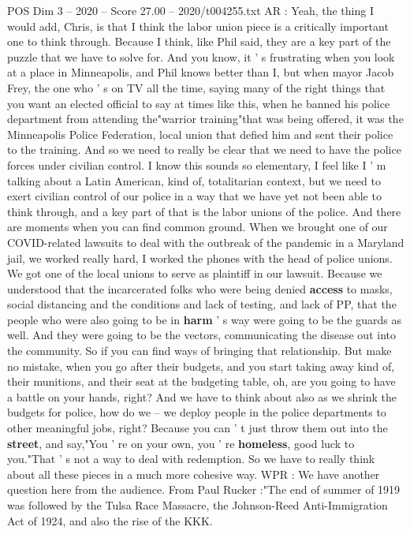 \begin{textsample}{POS Dim 3 – 2020 – Score 27.00 – 2020/t004255.txt}
AR : Yeah, the thing I would add, Chris, is that I think the labor union piece is a critically important one to think through.
Because I think, like Phil said, they are a key part of the puzzle that we have to solve for.
And you know, it ' s frustrating when you look at a place in Minneapolis, and Phil knows better than I, but when mayor Jacob Frey, the one who ' s on TV all the time, saying many of the right things that you want an elected official to say at times like this, when he banned his police department from attending the"warrior training"that was being offered, it was the Minneapolis Police Federation, local union that defied him and sent their police to the training.
And so we need to really be clear that we need to have the police forces under civilian control.
I know this sounds so elementary, I feel like I ' m talking about a Latin American, kind of, totalitarian context, but we need to exert civilian control of our police in a way that we have yet not been able to think through, and a key part of that is the labor unions of the police.
And there are moments when you can find common ground.
When we brought one of our COVID-related lawsuits to deal with the outbreak of the pandemic in a Maryland jail, we worked really hard, I worked the phones with the head of police unions.
We got one of the local unions to serve as plaintiff in our lawsuit.
Because we understood that the incarcerated folks who were being denied \textbf{access} to masks, social distancing and the conditions and lack of testing, and lack of PP, that the people who were also going to be in \textbf{harm} ' s way were going to be the guards as well.
And they were going to be the vectors, communicating the disease out into the community.
So if you can find ways of bringing that relationship.
But make no mistake, when you go after their budgets, and you start taking away kind of, their munitions, and their seat at the budgeting table, oh, are you going to have a battle on your hands, right?
And we have to think about also as we shrink the budgets for police, how do we -- we deploy people in the police departments to other meaningful jobs, right?
Because you can ' t just throw them out into the \textbf{street}, and say,"You ' re on your own, you ' re \textbf{homeless}, good luck to you."That ' s not a way to deal with redemption.
So we have to really think about all these pieces in a much more cohesive way.
WPR : We have another question here from the audience.
From Paul Rucker :"The end of summer of 1919 was followed by the Tulsa Race Massacre, the Johnson-Reed Anti-Immigration Act of 1924, and also the rise of the KKK.

\end{textsample}
